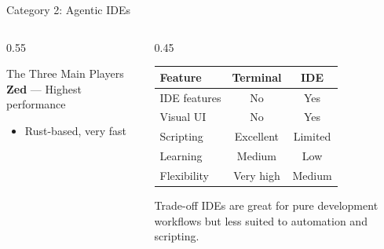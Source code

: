 \documentclass[aspectratio=169,11pt]{beamer}
\begin{document}
\begin{frame}{Category 2: Agentic IDEs}
\begin{columns}[T]
\begin{column}{0.55\textwidth}
\begin{block}{The Three Main Players}
                \textbf{Zed} --- Highest performance
                \begin{itemize}
                    \item Rust-based, very fast
                \end{itemize}
            \end{block}
        \end{column}
        \begin{column}{0.45\textwidth}
            \small
            \begin{center}
                \begin{tabular}{@{}l c c@{}}
                    \toprule
                    \textbf{Feature} & \textbf{Terminal} & \textbf{IDE} \\
                    \midrule
                    IDE features & No & Yes \\
                    Visual UI & No & Yes \\
                    Scripting & Excellent & Limited \\
                    Learning & Medium & Low \\
                    Flexibility & Very high & Medium \\
                    \bottomrule
                \end{tabular}
            \end{center}

            \vspace{0.3cm}
            \begin{alertblock}{Trade-off}
                IDEs are great for pure development workflows but less suited to automation and scripting.
            \end{alertblock}
        \end{column}
    \end{columns}

\end{frame}
\end{document}
